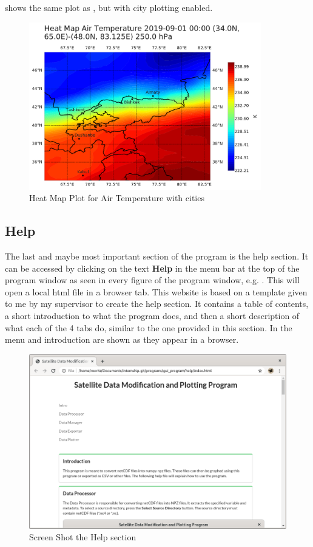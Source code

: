 \documentclass[../00_main.tex]{subfiles}
\begin{document}
 shows the same plot as , but with city
plotting enabled.
\begin{figure}[h]
    \center
    \includegraphics[width=0.9\textwidth]{../graphics/plt03}
    \caption{Heat Map Plot for Air Temperature with cities}
    \label{plt:dpl03}
\end{figure}

\subsection{Help}

The last and maybe most important section of the program is the help section.
It can be accessed by clicking on the text \textbf{Help} in the menu bar at the
top of the program window as seen in every figure of the program window, e.g.
. This will open a local html file in a browser tab. This website
is based on a template given to me by my supervisor to create the help
section. It contains a table of contents, a short introduction to what the
program does, and then a short description of what each of the 4 tabs do,
similar to the one provided in this section. In  the menu and
introduction are shown as they appear in a browser.
\begin{figure}[H]
    \center
    \includegraphics[width=\textwidth]{../graphics/help}
    \caption{Screen Shot the Help section}
    \label{help}
\end{figure}
\end{document}
